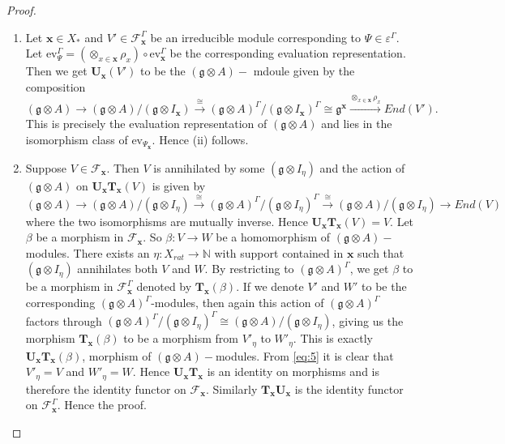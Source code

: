 \documentclass[11pt]{amsart}
\theoremstyle{plain}
\theoremstyle{definition}
\newcommand{\g}{\mathfrak{g}}
\begin{document}
\begin{proof}
\begin{enumerate}[label=(\alph*)]
    \item Let $\textbf{x}\in X_{*}$ and $V'\in\mathcal{F}_{\textbf{x}}^{\Gamma}$ be an irreducible module  corresponding to $\Psi\in\varepsilon^{\Gamma}$. Let $\mbox{ev}_{\Psi}^{\Gamma}=(\otimes_{x\in\textbf{x}}\rho_{x})\circ\mbox{ev}_{\textbf{x}}^{\Gamma}$ be the corresponding evaluation representation. Then we get $\textbf{U}_{\textbf{x}}(V')$ to be the $(\g\otimes A)-$ mdoule given by the composition
    \begin{equation*}
        (\g\otimes A)\rightarrow(\g\otimes
        A)/(\g\otimes I_{\textbf{x}})\xrightarrow{\cong}(\g\otimes A)^{\Gamma}/(\g\otimes I_{\textbf{x}})^{\Gamma}\cong\g^{\textbf{x}}\xrightarrow{\otimes_{x\in\textbf{x}}\rho_{x}}End(V').
    \end{equation*}
    This is precisely the evaluation representation of $(\g\otimes A)$ and lies in the isomorphism class of $\mbox{ev}_{\Psi_\textbf{x}}$. Hence (ii) follows.
    \item Suppose $V\in \mathcal{F}_{\textbf{x}}$. Then $V$ is annihilated by some $(\g\otimes I_{\eta})$ and the action of $(\g\otimes A)$ on $\textbf{U}_{\textbf{x}}\textbf{T}_{\textbf{x}}(V)$ is given by
    \begin{equation*}
        (\g\otimes A)\rightarrow(\g\otimes A)/(\g\otimes I_{\eta})\xrightarrow{\cong}(\g\otimes A)^{\Gamma}/(\g\otimes I_{\eta})^{\Gamma}\xrightarrow{\cong}(\g\otimes A)/(\g\otimes I_{\eta})\rightarrow End(V)
    \end{equation*}
    where the two isomorphisms are mutually inverse. Hence $\textbf{U}_{\textbf{x}}\textbf{T}_{\textbf{x}}(V)=V$. Let $\beta$ be a morphism in $\mathcal{F}_{\textbf{x}}$. So $\beta:V\rightarrow W$ be a homomorphism of $(\g\otimes A)-$modules. There exists an $\eta: X_{rat}\rightarrow\mathbb{N}$ with support contained in $\textbf{x}$ such that $(\g\otimes I_{\eta})$ annihilates both $V$ and $W$. By restricting to $(\g\otimes A)^{\Gamma}$, we get $\beta$ to be a morphism in $\mathcal{F}_{\textbf{x}}^{\Gamma}$ denoted by $\textbf{T}_{\textbf{x}}(\beta)$. If we denote $V'$ and $W'$ to be the corresponding $(\g\otimes A)^{\Gamma}$-modules, then again this action of $(\g\otimes A)^\Gamma$ factors through $(\g\otimes A)^{\Gamma}/(\g\otimes I_{\eta})^{\Gamma}\cong(\g\otimes A)/(\g\otimes I_{\eta})$, giving us the morphism $\textbf{T}_{\textbf{x}}(\beta)$ to be a morphism from $V'_{\eta}$ to $W'_{\eta}$. This is exactly $\textbf{U}_{\textbf{x}}\textbf{T}_{\textbf{x}}(\beta)$, morphism of $(\g\otimes A)-$modules. From \eqref{eq:5} it is clear that $V'_{\eta}=V$ and $W'_{\eta}=W$. Hence $\textbf{U}_{\textbf{x}}\textbf{T}_{\textbf{x}}$ is an identity on morphisms and is therefore the identity functor on $\mathcal{F}_{\textbf{x}}$. Similarly $\textbf{T}_{\textbf{x}}\textbf{U}_{\textbf{x}}$ is the identity functor on $\mathcal{F}^{\Gamma}_{\textbf{x}}$. Hence the proof.   
\end{enumerate}
\end{proof}
\end{document}

